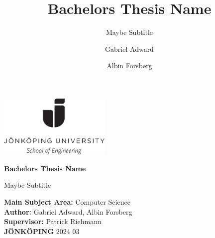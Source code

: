 \documentclass[11pt]{scrreprt}
\title{Bachelors Thesis Name}
\subtitle{Maybe Subtitle}
\author{Gabriel Adward \and Albin Forsberg}
\begin{document}
\begin{titlepage}
        \includegraphics[width=0.4\textwidth]{./Images/ju.png}
        \vspace{2cm}
        
        \fontsize{40}{40}\selectfont
        \textbf{Bachelors Thesis Name}
        
        \vspace{0.5cm}
        \LARGE
        Maybe Subtitle
        
        \vfill
        \small
        \noindent
        \textbf{Main Subject Area:} Computer Science \\
        \textbf{Author:} Gabriel Adward, Albin Forsberg \\
        \textbf{Supervisor:} Patrick Riehmann \\
        \textbf{JÖNKÖPING} 2024 03
\end{titlepage}


\begin{abstract}
    
\end{abstract}

\tableofcontents










\cite{greenwade93}



\end{document}
